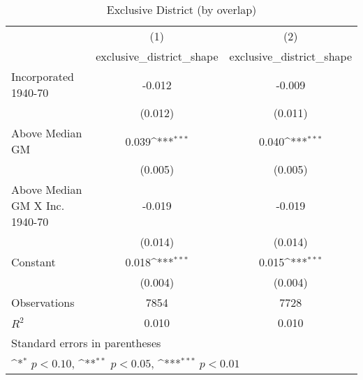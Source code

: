\begin{table}[htbp]\centering
\def\sym#1{\ifmmode^{#1}\else\(^{#1}\)\fi}
\caption{Exclusive District (by overlap)}
\begin{tabular}{l*{2}{c}}
\hline\hline
                    &\multicolumn{1}{c}{(1)}&\multicolumn{1}{c}{(2)}\\
                    &\multicolumn{1}{c}{exclusive\_district\_shape}&\multicolumn{1}{c}{exclusive\_district\_shape}\\
\hline
Incorporated 1940-70&      -0.012         &      -0.009         \\
                    &     (0.012)         &     (0.011)         \\
[1em]
Above Median GM     &       0.039\sym{***}&       0.040\sym{***}\\
                    &     (0.005)         &     (0.005)         \\
[1em]
Above Median GM X Inc. 1940-70&      -0.019         &      -0.019         \\
                    &     (0.014)         &     (0.014)         \\
[1em]
Constant            &       0.018\sym{***}&       0.015\sym{***}\\
                    &     (0.004)         &     (0.004)         \\
\hline
Observations        &        7854         &        7728         \\
\(R^{2}\)           &       0.010         &       0.010         \\
\hline\hline
\multicolumn{3}{l}{\footnotesize Standard errors in parentheses}\\
\multicolumn{3}{l}{\footnotesize \sym{*} \(p<0.10\), \sym{**} \(p<0.05\), \sym{***} \(p<0.01\)}\\
\end{tabular}
\end{table}
